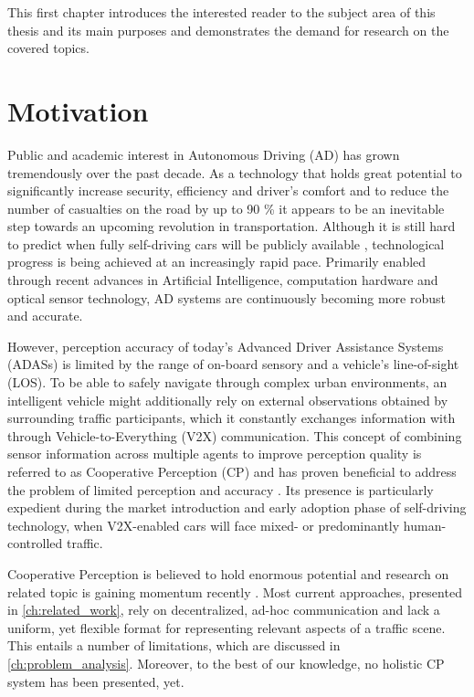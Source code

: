 This first chapter introduces the interested reader to the subject area of this thesis and its main purposes and demonstrates the demand for research on the covered topics. 

\section{Motivation}
\label{sec:motivation}
Public and academic interest in Autonomous Driving (AD) has grown tremendously over the past decade. As a technology that holds great potential to significantly increase security, efficiency and driver's comfort and to reduce the number of casualties on the road by up to 90 \% \cite{Markwalter2017} it appears to be an inevitable step towards an upcoming revolution in transportation.
Although it is still hard to predict when fully self-driving cars will be publicly available \cite{Frost&SulivanConsulting2018}, technological progress is being achieved at an increasingly rapid pace. Primarily enabled through recent advances in Artificial Intelligence, computation hardware and optical sensor technology, AD systems are continuously becoming more robust and accurate.
\par
\bigskip

However, perception accuracy of today's Advanced Driver Assistance Systems (ADASs) is limited by the range of on-board sensory and a vehicle's line-of-sight (LOS). To be able to safely navigate through complex urban environments, an intelligent vehicle might additionally rely on external observations obtained by surrounding traffic participants, which it constantly exchanges information with through Vehicle-to-Everything (V2X) communication. This concept of combining sensor information across multiple agents to improve perception quality is referred to as Cooperative Perception (CP) and has proven beneficial to address the problem of limited perception and accuracy \cite{Chen2019, Hohm2019}. Its presence is particularly expedient during the market introduction and early adoption phase of self-driving technology, when V2X-enabled cars will face mixed- or predominantly human-controlled traffic.  
\par
\bigskip

Cooperative Perception is believed to hold enormous potential \cite{Gunther2015} and research on related topic is gaining momentum recently \cite{Chen2019, Thandavarayan2019, Calvo2017, BMWGroup2019}. Most current approaches, presented in \cref{ch:related_work}, rely on decentralized, ad-hoc communication and lack a uniform, yet flexible format for representing relevant aspects of a traffic scene. This entails a number of limitations, which are discussed in \cref{ch:problem_analysis}. Moreover, to the best of our knowledge, no holistic CP system has been presented, yet. 
\par
\bigskip

